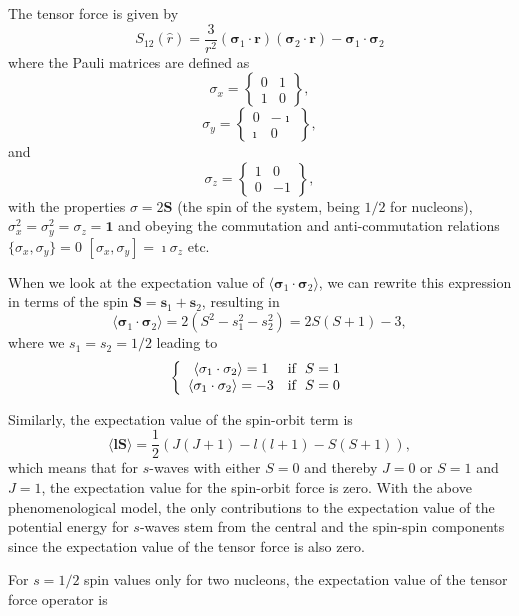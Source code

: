 \documentclass[graybox,sectrefs,envcountresetchap,open=right]{svmonodo}
\begin{document}
The tensor force is given by
\[
S_{12} (\hat r) = \frac{3}{r^2}\left(\mathbf{\sigma}_1\cdot \mathbf{r}\right) \left(\mathbf{\sigma}_2\cdot \mathbf{r}\right) -\mathbf{\sigma}_1\cdot\mathbf{\sigma}_2\]
where the Pauli matrices are defined as
\[
\sigma_x =\begin{Bmatrix} 0 & 1 \\ 1 & 0 \end{Bmatrix},
\]
\[
\sigma_y =\begin{Bmatrix} 0 & -\imath \\ \imath & 0 \end{Bmatrix},
\]
and
\[
\sigma_z =\begin{Bmatrix} 1 & 0 \\ 0 & -1 \end{Bmatrix},
\]
with the properties $\sigma = 2\mathbf{S}$ (the spin of the system, being $1/2$ for nucleons), 
$\sigma^2_x=\sigma^2_y=\sigma_z=\mathbf{1}$ and
obeying the commutation and anti-commutation relations $\{\sigma_x,\sigma_y\} =0$
$[\sigma_x,\sigma_y] =\imath\sigma_z$ etc.

\noindent
When we look at the expectation value of 
$\langle \mathbf{\sigma}_1\cdot\mathbf{\sigma}_2\rangle$, we can rewrite this expression in terms of the
spin $\mathbf{S}=\mathbf{s}_1+\mathbf{s}_2$, resulting in 
\[
\langle\mathbf{\sigma}_1\cdot\mathbf{\sigma}_2\rangle=2(S^2-s_1^2-s_2^2)=2S(S+1)-3,
\]
where we $s_1=s_2=1/2$ leading to
\[
\left\{ \begin{array}{cc} \langle\mathbf{\sigma}_1\cdot\mathbf{\sigma}_2\rangle=1 &  \mathrm{if} \hspace{0.2cm} S=1\\
\langle\mathbf{\sigma}_1\cdot\mathbf{\sigma}_2\rangle=-3 & \mathrm{if} \hspace{0.2cm} S=0\\\end{array}\right.
\]

\noindent
Similarly, the expectation value of the spin-orbit term is 
\[
\langle \mathbf{l}\mathbf{S} \rangle = \frac{1}{2}\left( J(J+1)-l(l+1)-S(S+1)\right),
\]
which means that for $s$-waves with either $S=0$ and thereby $J=0$ or $S=1$ and $J=1$, 
the expectation value for the
spin-orbit force is zero. With the above phenomenological model, the
only contributions to the expectation value of the potential energy for $s$-waves
stem  from the central and the spin-spin components since the
expectation value of the tensor force is also zero.

\noindent
 For $s=1/2$ spin values only for two nucleons, the expectation value of the tensor force operator is 
\end{document}
